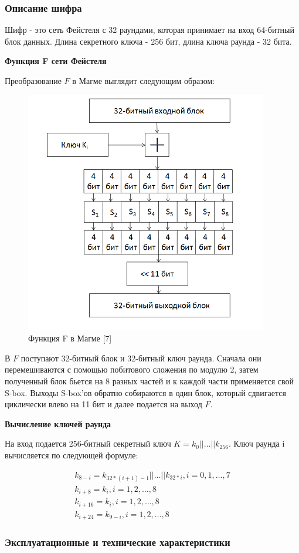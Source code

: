 \documentclass[colorthm]{./civarticle}
\begin{document}
\subsubsection{Описание шифра \textquotedbl}
 
Шифр \textquotedbl - это сеть Фейстеля с 32 раундами, которая принимает на вход 64-битный блок данных. Длина секретного ключа - 256 бит, длина ключа раунда - 32 бита.

\textbf{Функция F сети Фейстеля}

Преобразование $F$ в Магме выглядит следующим образом:

\begin{figure}[H]
    \centering
    \includegraphics[width=0.25\linewidth]{Feistel_function_GOST.png}
    \caption{Функция F в Магме [7]}
    \label{fig:enter-label}
\end{figure}

В $F$ поступают 32-битный блок и 32-битный ключ раунда. Сначала они перемешиваются с помощью побитового сложения по модулю 2, затем полученный блок бьется на 8 разных частей и к каждой части применяется свой S-box. Выходы S-box'ов обратно собираются в один блок, который сдвигается циклически влево на 11 бит и далее подается на выход $F$.

\textbf{Вычисление ключей раунда}

На вход подается 256-битный секретный ключ $K=k_0||\dots||k_{256}$. Ключ раунда i вычисляется по следующей формуле:

\begin{equation}
    \begin{split}
        k_{8-i} = k_{32*(i+1)-1}||\dots||k_{32*i}, i=0,1,\dots,7 \\
    k_{i+8} = k_i, i=1,2,\dots,8 \\
    k_{i+16} = k_i, i=1,2,\dots,8 \\
    k_{i+24} = k_{9-i}, i=1,2,\dots,8  
    \end{split}
\end{equation}

\subsubsection{Эксплуатационные и технические характеристики}
\end{document}
